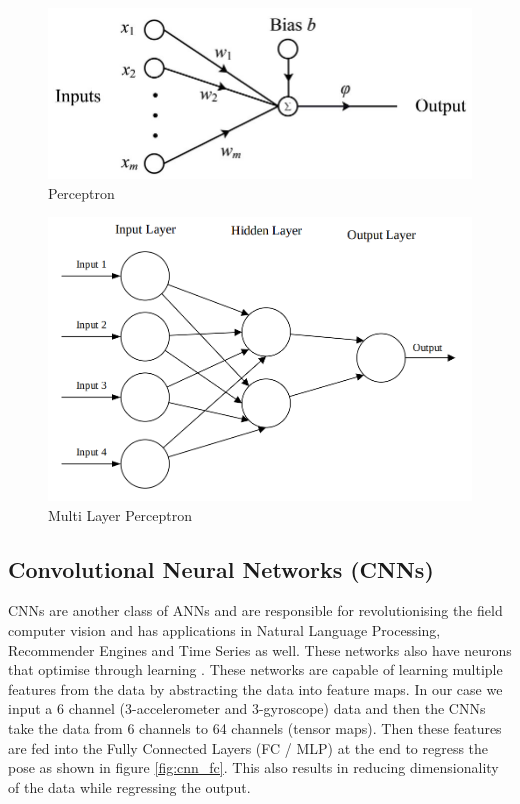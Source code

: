 \begin{figure}[H]
    \centering
    \includegraphics[scale=0.5]{images/fig_chapter2/nns/perceptron.png}
    \caption{Perceptron}
    \label{fig:perceptron}
\end{figure}

\begin{figure}[H]
    \centering
    \includegraphics[scale=0.3]{images/fig_chapter2/nns/mlp.png}
    \caption{Multi Layer Perceptron}
    \label{fig:mlp}
\end{figure}

\subsection{Convolutional Neural Networks (CNNs)}
CNNs are another class of ANNs and are responsible for revolutionising the field computer vision and has applications in Natural Language Processing, Recommender Engines and Time Series as well. These networks also have neurons that optimise through learning \citep{cnn2015introduction}. These networks are capable of learning multiple features from the data by abstracting the data into feature maps. In our case we input a 6 channel (3-accelerometer and 3-gyroscope) data and then the CNNs take the data from 6 channels to 64 channels (tensor maps). Then these features are fed into the Fully Connected Layers (FC / MLP) at the end to regress the pose as shown in figure \ref{fig:cnn_fc}. This also results in reducing dimensionality of the data while regressing the output. 

